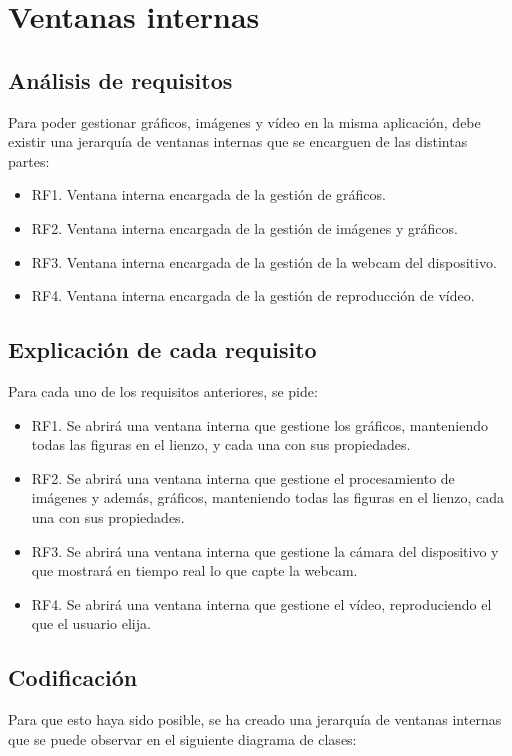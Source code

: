 \documentclass[11pt,a4paper]{article}
\begin{document}
\newpage

\section{Ventanas internas}

\subsection{Análisis de requisitos}
Para poder gestionar gráficos, imágenes y vídeo en la misma aplicación, debe existir una jerarquía de ventanas internas que se encarguen de las distintas partes:

\begin{itemize}
	\item RF1. Ventana interna encargada de la gestión de gráficos.
	\item RF2. Ventana interna encargada de la gestión de imágenes y gráficos.
	\item RF3. Ventana interna encargada de la gestión de la webcam del dispositivo.
	\item RF4. Ventana interna encargada de la gestión de reproducción de vídeo.
\end{itemize}

\subsection{Explicación de cada requisito}
Para cada uno de los requisitos anteriores, se pide:

\begin{itemize}
	\item RF1. Se abrirá una ventana interna que gestione los gráficos, manteniendo todas las figuras en el lienzo, y cada una con sus propiedades.
	\item RF2. Se abrirá una ventana interna que gestione el procesamiento de imágenes y además, gráficos, manteniendo todas las figuras en el lienzo, cada una con sus propiedades.
	\item RF3. Se abrirá una ventana interna que gestione la cámara del dispositivo y que mostrará en tiempo real lo que capte la webcam.
	\item RF4. Se abrirá una ventana interna que gestione el vídeo, reproduciendo el que el usuario elija.
\end{itemize}

\subsection{Codificación}
Para que esto haya sido posible, se ha creado una jerarquía de ventanas internas que se puede observar en el siguiente diagrama de clases:
\end{document}
